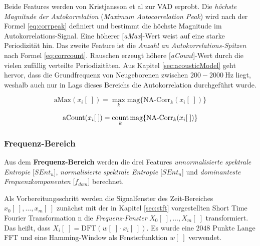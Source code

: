 Beide Features werden von Kristjansson et al \cite[S. 1 - 2]{vad_Lisboa} zur VAD erprobt. Die \emph{höchste Magnitude der Autokorrelation }  (\emph{Maximum Autocorrelation Peak}) wird nach der Formel \ref{eq:corrpeak} definiert und bestimmt die höchste Magnitude im Autokorrelations-Signal. Eine höherer [\emph{aMax}]-Wert weist auf eine starke Periodizität hin. Das zweite Feature ist die \emph{Anzahl an Autokorrelations-Spitzen} nach Formel \ref{eq:corrcount}. Rauschen erzeugt höhere [\emph{aCount}]-Wert durch die vielen zufällig verteilte Periodizitäten. Aus Kapitel \ref{sec:acousticModel} geht hervor, dass die Grundfrequenz von Neugeborenen zwischen $200 - \SI{2000}{\hertz}$ liegt, weshalb auch nur in Lags dieses Bereichs die Autokorrelation durchgeführt wurde.

\begin{equation}
\text{aMax}(x_i[\;]) = \max_{k}\text{mag}\{\text{NA-Corr}_k(x_i[\;])\}
\label{eq:corrpeak}
\end{equation}

\begin{equation}
\text{aCount}(x_i[\;]) = \operatorname*{count}_{k}\text{mag}\{\text{NA-Corr}_k(x_i[\;])\}
\label{eq:corrcount}
\end{equation}


\subsubsection{Frequenz-Bereich}

Aus dem \textbf{Frequenz-Bereich} werden die drei Features \emph{unnormalisierte spektrale Entropie} [$SEnt_{u}$], \emph{normalisierte spektrale Entropie}  [$SEnt_{n}$] und \emph{dominanteste Frequenzkomponenten} [$f_{dom}$] berechnet. 

Als Vorbereitungsschritt werden die Signalfenster des Zeit-Bereiches $x_0[\;] , \ldots , x_m[\;]$ zunächst mit der in Kapitel \ref{sec:stft} vorgestellten Short Time Fourier Transformation n die \emph{Frequenz-Fenster}  $X_0[\;] , \ldots , X_m[\;]$ transformiert. Das heißt, dass $X_i[\;] = \text{DFT}(w[\;] \cdot x_i[\;])$. Es wurde eine $2048$ Punkte Lange FFT und eine Hamming-Window als Fensterfunktion $w[\;]$ verwendet.


